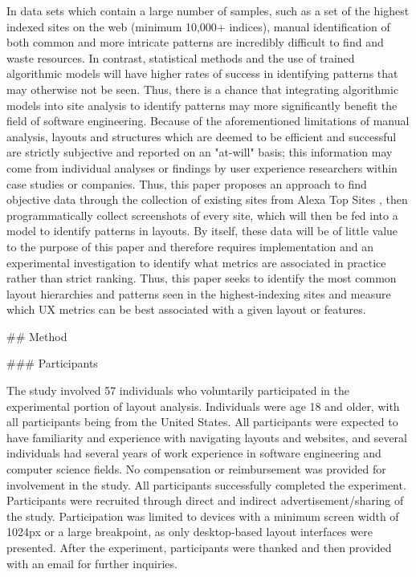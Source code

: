 In data sets which contain a large number of samples, such as a set of the highest indexed sites on the web (minimum 10,000+ indices), manual identification of both common and more intricate patterns are incredibly difficult to find and waste resources. In contrast, statistical methods and the use of trained algorithmic models will have higher rates of success in identifying patterns that may otherwise not be seen. Thus, there is a chance that integrating algorithmic models into site analysis to identify patterns may more significantly benefit the field of software engineering. Because of the aforementioned limitations of manual analysis, layouts and structures which are deemed to be efficient and successful are strictly subjective and reported on an "at-will" basis; this information may come from individual analyses or findings by user experience researchers within case studies or companies. Thus, this paper proposes an approach to find objective data through the collection of existing sites from Alexa Top Sites \cite{antoniou_2015}, then programmatically collect screenshots of every site, which will then be fed into a model to identify patterns in layouts. By itself, these data will be of little value to the purpose of this paper and therefore requires implementation and an experimental investigation to identify what metrics are associated in practice rather than strict ranking. Thus, this paper seeks to identify the most common layout hierarchies and patterns seen in the highest-indexing sites and measure which UX metrics can be best associated with a given layout or features.

## Method

### Participants

The study involved 57 individuals who voluntarily participated in the experimental portion of layout analysis. Individuals were age 18 and older, with all participants being from the United States. All participants were expected to have familiarity and experience with navigating layouts and websites, and several individuals had several years of work experience in software engineering and computer science fields. No compensation or reimbursement was provided for involvement in the study. All participants successfully completed the experiment. Participants were recruited through direct and indirect advertisement/sharing of the study. Participation was limited to devices with a minimum screen width of 1024px or a large breakpoint, as only desktop-based layout interfaces were presented. After the experiment, participants were thanked and then provided with an email for further inquiries.


